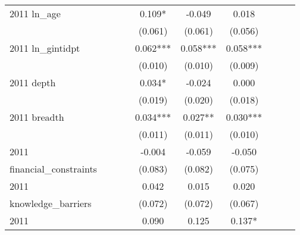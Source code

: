 \begin{table}[htbp]
\begin{tabular}{l*{9}{c}}
2011 ln\_age         &               &               &               &       0.109*  &      -0.049   &       0.018   &               &               &               \\
                    &               &               &               &     (0.061)   &     (0.061)   &     (0.056)   &               &               &               \\
2011 ln\_gintidpt    &               &               &               &       0.062***&       0.058***&       0.058***&               &               &               \\
                    &               &               &               &     (0.010)   &     (0.010)   &     (0.009)   &               &               &               \\
2011 depth          &               &               &               &       0.034*  &      -0.024   &       0.000   &               &               &               \\
                    &               &               &               &     (0.019)   &     (0.020)   &     (0.018)   &               &               &               \\
2011 breadth        &               &               &               &       0.034***&       0.027** &       0.030***&               &               &               \\
                    &               &               &               &     (0.011)   &     (0.011)   &     (0.010)   &               &               &               \\
2011                &               &               &               &      -0.004   &      -0.059   &      -0.050   &               &               &               \\
financial\_constraints&               &               &               &     (0.083)   &     (0.082)   &     (0.075)   &               &               &               \\
2011                &               &               &               &       0.042   &       0.015   &       0.020   &               &               &               \\
knowledge\_barriers  &               &               &               &     (0.072)   &     (0.072)   &     (0.067)   &               &               &               \\
2011                &               &               &               &       0.090   &       0.125   &       0.137*  &               &               &               \\

\end{tabular}
\end{table}
